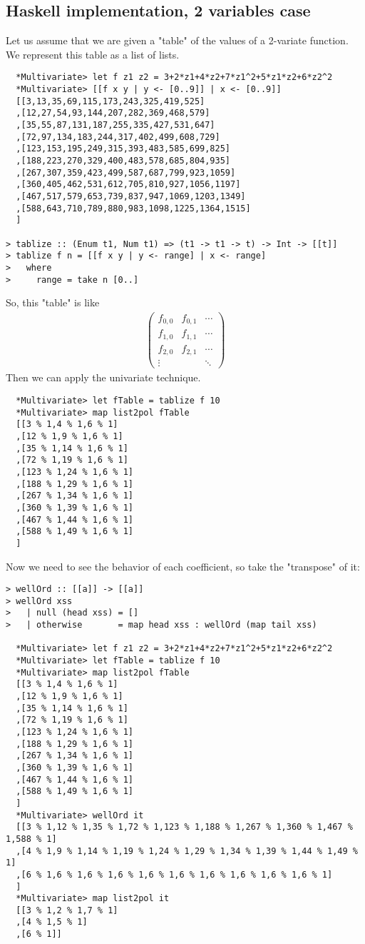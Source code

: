 \documentclass[11pt]{book}
\begin{document}
\subsection{Haskell implementation, 2 variables case}
Let us assume that we are given a "table" of the values of a 2-variate function.
We represent this table as a list of lists.
\begin{verbatim}
  *Multivariate> let f z1 z2 = 3+2*z1+4*z2+7*z1^2+5*z1*z2+6*z2^2
  *Multivariate> [[f x y | y <- [0..9]] | x <- [0..9]]
  [[3,13,35,69,115,173,243,325,419,525]
  ,[12,27,54,93,144,207,282,369,468,579]
  ,[35,55,87,131,187,255,335,427,531,647]
  ,[72,97,134,183,244,317,402,499,608,729]
  ,[123,153,195,249,315,393,483,585,699,825]
  ,[188,223,270,329,400,483,578,685,804,935]
  ,[267,307,359,423,499,587,687,799,923,1059]
  ,[360,405,462,531,612,705,810,927,1056,1197]
  ,[467,517,579,653,739,837,947,1069,1203,1349]
  ,[588,643,710,789,880,983,1098,1225,1364,1515]
  ]

> tablize :: (Enum t1, Num t1) => (t1 -> t1 -> t) -> Int -> [[t]]
> tablize f n = [[f x y | y <- range] | x <- range]
>   where
>     range = take n [0..]
\end{verbatim}
So, this "table" is like
\begin{eqnarray}
\left(\begin{array}{ccc} f_{0,0} & f_{0,1} & \cdots \\ f_{1,0} & f_{1,1} & \cdots \\f_{2,0} & f_{2,1} & \cdots \\ \vdots && \ddots \end{array}\right)
\end{eqnarray}
Then we can apply the univariate technique.
\begin{verbatim}
  *Multivariate> let fTable = tablize f 10
  *Multivariate> map list2pol fTable 
  [[3 % 1,4 % 1,6 % 1]
  ,[12 % 1,9 % 1,6 % 1]
  ,[35 % 1,14 % 1,6 % 1]
  ,[72 % 1,19 % 1,6 % 1]
  ,[123 % 1,24 % 1,6 % 1]
  ,[188 % 1,29 % 1,6 % 1]
  ,[267 % 1,34 % 1,6 % 1]
  ,[360 % 1,39 % 1,6 % 1]
  ,[467 % 1,44 % 1,6 % 1]
  ,[588 % 1,49 % 1,6 % 1]
  ]
\end{verbatim}
Now we need to see the behavior of each coefficient, so take the "transpose" of it:
\begin{verbatim}
> wellOrd :: [[a]] -> [[a]]
> wellOrd xss 
>   | null (head xss) = [] 
>   | otherwise       = map head xss : wellOrd (map tail xss)

  *Multivariate> let f z1 z2 = 3+2*z1+4*z2+7*z1^2+5*z1*z2+6*z2^2
  *Multivariate> let fTable = tablize f 10
  *Multivariate> map list2pol fTable 
  [[3 % 1,4 % 1,6 % 1]
  ,[12 % 1,9 % 1,6 % 1]
  ,[35 % 1,14 % 1,6 % 1]
  ,[72 % 1,19 % 1,6 % 1]
  ,[123 % 1,24 % 1,6 % 1]
  ,[188 % 1,29 % 1,6 % 1]
  ,[267 % 1,34 % 1,6 % 1]
  ,[360 % 1,39 % 1,6 % 1]
  ,[467 % 1,44 % 1,6 % 1]
  ,[588 % 1,49 % 1,6 % 1]
  ]
  *Multivariate> wellOrd it
  [[3 % 1,12 % 1,35 % 1,72 % 1,123 % 1,188 % 1,267 % 1,360 % 1,467 % 1,588 % 1]
  ,[4 % 1,9 % 1,14 % 1,19 % 1,24 % 1,29 % 1,34 % 1,39 % 1,44 % 1,49 % 1]
  ,[6 % 1,6 % 1,6 % 1,6 % 1,6 % 1,6 % 1,6 % 1,6 % 1,6 % 1,6 % 1]
  ]
  *Multivariate> map list2pol it
  [[3 % 1,2 % 1,7 % 1]
  ,[4 % 1,5 % 1]
  ,[6 % 1]]
\end{verbatim}
\end{document}
